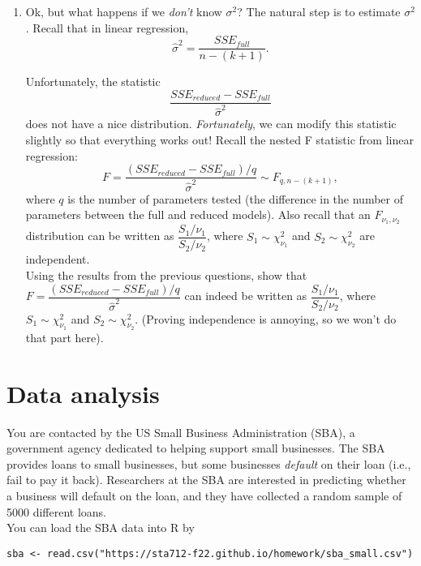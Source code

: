 \documentclass[11pt]{article}
\begin{document}
\begin{enumerate}
\begin{enumerate}
\item Ok, but what happens if we \textit{don't} know $\sigma^2$? The natural step is to estimate $\sigma^2$. Recall that in linear regression, 
$$\widehat{\sigma}^2 = \dfrac{SSE_{full}}{n - (k + 1)}.$$

Unfortunately, the statistic
$$\dfrac{SSE_{reduced} - SSE_{full}}{\widehat{\sigma}^2}$$
does not have a nice distribution. \textit{Fortunately}, we can modify this statistic slightly so that everything works out! Recall the nested F statistic from linear regression:
$$F = \dfrac{(SSE_{reduced} - SSE_{full})/q}{\widehat{\sigma}^2} \sim F_{q, n - (k + 1)},$$
where $q$ is the number of parameters tested (the difference in the number of parameters between the full and reduced models). Also recall that an $F_{\nu_1, \nu_2}$ distribution can be written as $\dfrac{S_1 / \nu_1}{S_2 / \nu_2}$, where $S_1 \sim \chi^2_{\nu_1}$ and $S_2 \sim \chi^2_{\nu_2}$ are independent.\\

Using the results from the previous questions, show that $F = \dfrac{(SSE_{reduced} - SSE_{full})/q}{\widehat{\sigma}^2}$ can indeed be written as $\dfrac{S_1 / \nu_1}{S_2 / \nu_2}$, where $S_1 \sim \chi^2_{\nu_1}$ and $S_2 \sim \chi^2_{\nu_2}$. (Proving independence is annoying, so we won't do that part here).

\end{enumerate}
\end{enumerate}

\newpage


\section*{Data analysis}

You are contacted by the US Small Business Administration (SBA), a government agency dedicated to helping support small businesses. The SBA provides loans to small businesses, but some businesses \textit{default} on their loan (i.e., fail to pay it back). Researchers at the SBA are interested in predicting whether a business will default on the loan, and they have collected a random sample of 5000 different loans.\\

\noindent You can load the SBA data into R by

\begin{verbatim}
sba <- read.csv("https://sta712-f22.github.io/homework/sba_small.csv")
\end{verbatim}
\end{document}
